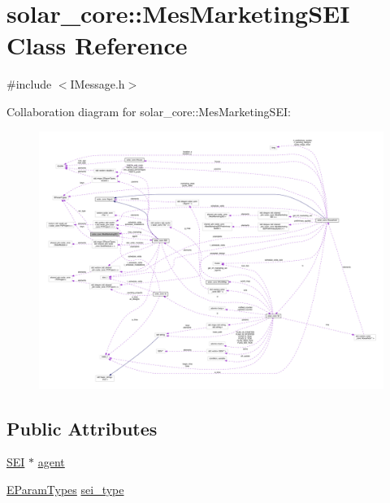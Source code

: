 \hypertarget{classsolar__core_1_1_mes_marketing_s_e_i}{}\section{solar\+\_\+core\+:\+:Mes\+Marketing\+S\+E\+I Class Reference}
\label{classsolar__core_1_1_mes_marketing_s_e_i}


{\ttfamily \#include $<$I\+Message.\+h$>$}



Collaboration diagram for solar\+\_\+core\+:\+:Mes\+Marketing\+S\+E\+I\+:
\nopagebreak
\begin{figure}[H]
\begin{center}
\leavevmode
\includegraphics[width=350pt]{classsolar__core_1_1_mes_marketing_s_e_i__coll__graph}
\end{center}
\end{figure}
\subsection*{Public Attributes}
\begin{DoxyCompactItemize}
\item 
\hyperlink{classsolar__core_1_1_s_e_i}{S\+E\+I} $\ast$ \hyperlink{classsolar__core_1_1_mes_marketing_s_e_i_a5bc5eb8bf309e6ba96cfdc0feb01baa9}{agent}
\item 
\hyperlink{namespacesolar__core_aa1147341e5ef7a40d68d1bd68e149362}{E\+Param\+Types} \hyperlink{classsolar__core_1_1_mes_marketing_s_e_i_a8897df83278137d8ff4b04c068e4370e}{sei\+\_\+type}
\end{DoxyCompactItemize}


